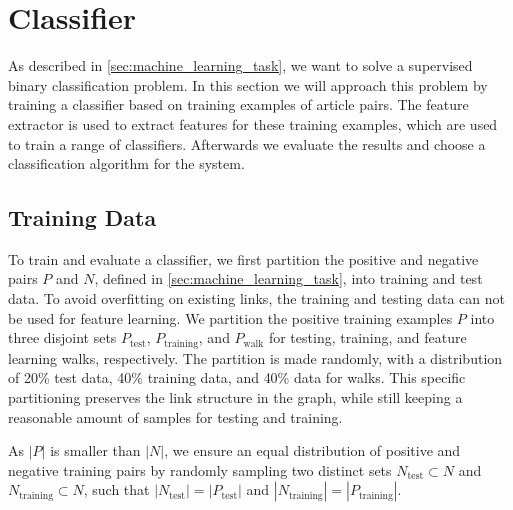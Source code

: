 \section{Classifier}\label{sec:classifier}
As described in \cref{sec:machine_learning_task}, we want to solve a supervised binary classification problem. In this section we will approach this problem by training a classifier based on training examples of article pairs. The feature extractor is used to extract features for these training examples, which are used to train a range of classifiers. Afterwards we evaluate the results and choose a classification algorithm for the system.

\subsection{Training Data}\label{sec:training_data}
To train and evaluate a classifier, we first partition the positive and negative pairs $P$ and $N$, defined in \cref{sec:machine_learning_task}, into training and test data. To avoid overfitting on existing links, the training and testing data can not be used for feature learning. We partition the positive training examples $P$ into three disjoint sets $P_\text{test}$, $P_\text{training}$, and $P_\text{walk}$ for testing, training, and feature learning walks, respectively. The partition is made randomly, with a distribution of 20\% test data, 40\% training data, and 40\% data for walks. This specific partitioning preserves the link structure in the graph, while still keeping a reasonable amount of samples for testing and training.



As $\left\vert{P}\right\vert$ is smaller than $\left\vert{N}\right\vert$, we ensure an equal distribution of positive and negative training pairs by randomly sampling two distinct sets $N_\text{test} \subset N$ and $N_\text{training} \subset N$, such that $\left\vert{N_\text{test}}\right\vert=\left\vert{P_\text{test}}\right\vert$ and $\left\vert{N_\text{training}}\right\vert=\left\vert{P_\text{training}}\right\vert$.





